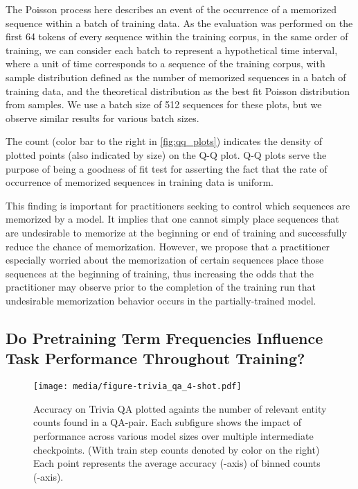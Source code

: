 \documentclass{article}
\theoremstyle{plain}
\theoremstyle{definition}
\theoremstyle{remark}
\begin{document}
The Poisson process here describes an event of the occurrence of a memorized sequence within a batch of training data. As the evaluation was performed on the first 64 tokens of every sequence within the training corpus, in the same order of training, we can consider each batch to represent a hypothetical time interval, where a unit of time corresponds to a sequence of the training corpus, with sample distribution defined as the number of memorized sequences in a batch of training data, and the theoretical distribution as the best fit Poisson distribution from samples. We use a batch size of 512 sequences for these plots, but we observe similar results for various batch sizes.




The count (color bar to the right in \cref{fig:qq_plots}) indicates the density of plotted points (also indicated by size) on the Q-Q plot. Q-Q plots serve the purpose of being a goodness of fit test for asserting the fact that the rate of occurrence of memorized sequences in training data is uniform.



This finding is important for practitioners seeking to control which sequences are memorized by a model. It implies that one cannot simply place sequences that are undesirable to memorize at the beginning or end of training and successfully reduce the chance of memorization. However, we propose that a practitioner especially worried about the memorization of certain sequences place those sequences at the beginning of training, thus increasing the odds that the practitioner may observe prior to the completion of the training run that undesirable memorization behavior occurs in the partially-trained model.

\subsection{Do Pretraining Term Frequencies Influence Task Performance Throughout Training?}



\begin{figure*}[!htb]
\centering
\texttt{[image: media/figure-trivia\_qa\_4-shot.pdf]}
\caption{Accuracy on Trivia QA plotted againts the number of relevant entity counts found in a QA-pair. Each subfigure shows the impact of performance across various model sizes over multiple intermediate checkpoints. (With train step counts denoted by color on the right) Each point represents the average accuracy (-axis) of binned counts (-axis).}
\label{figure:trivia_qa}
\end{figure*}
\end{document}
